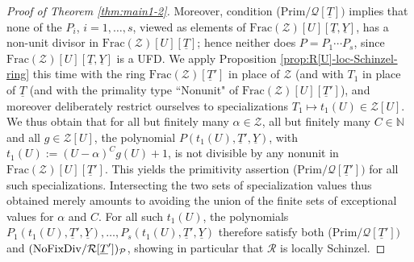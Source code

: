 \documentclass[11pt,a4paper,reqno]{amsart}
\theoremstyle{definition}
\begin{document}
\begin{proof}[Proof of Theorem \ref{thm:main1-2}]
 Moreover, condition {\rm (Prim}$/{\mathcal Q}[\underline T])$ implies that none of the $P_i$, $i=1,\dots, s$, viewed as elements of $\textrm{Frac}(\mathcal{Z})[U][\underline{T}, \underline{Y}]$, has a non-unit divisor in $\textrm{Frac}(\mathcal{Z})[U][\underline{T}]$; hence neither does $P=P_1\cdots P_s$, since $\textrm{Frac}(\mathcal{Z})[U][\underline{T}, \underline{Y}]$ is a UFD. 
We apply Proposition \ref{prop:R[U]-loc-Schinzel-ring} this time with the ring $\textrm{Frac}(\mathcal{Z})[\underline{T}']$ in place of $\mathcal{Z}$ (and with $T_1$ in place of $\underline{T}$ (and with the primality type ``Nonunit" of $\textrm{Frac}(\mathcal{Z})[U][\underline{T}']$), and moreover deliberately restrict ourselves to specializations $T_1\mapsto t_1(U)\in \mathcal{Z}[U]$. We thus obtain
that for all but finitely many $\alpha\in \mathcal{Z}$, all but finitely many $C\in \mathbb{N}$ and all $g\in \mathcal{Z}[U]$, the polynomial $P(t_1(U),\underline{T}', \underline{Y})$, with $t_1(U):=(U-\alpha)^C g(U)+1$, is not divisible by any nonunit in $\textrm{Frac}(\mathcal{Z})[U][\underline{T}']$. This yields the primitivity assertion {\rm(Prim}$/{\mathcal Q}[\underline T'])$ for all such specializations. Intersecting the two sets of specialization values thus obtained merely amounts to avoiding the union of the finite sets of exceptional values for $\alpha$ and $C$. For all such $t_1(U)$, the polynomials $P_1(t_1(U),\underline T', \underline Y), \dots, P_s(t_1(U),\underline T',\underline Y)$ therefore satisfy both {\rm(Prim}$/{\mathcal Q}[\underline T'])$ and $\hbox{\rm (NoFixDiv}/{\mathcal R}[\underline T'])_{\mathcal P}$, showing in particular that $\mathcal{R}$ is locally Schinzel.
\fi
\end{proof}
\end{document}
